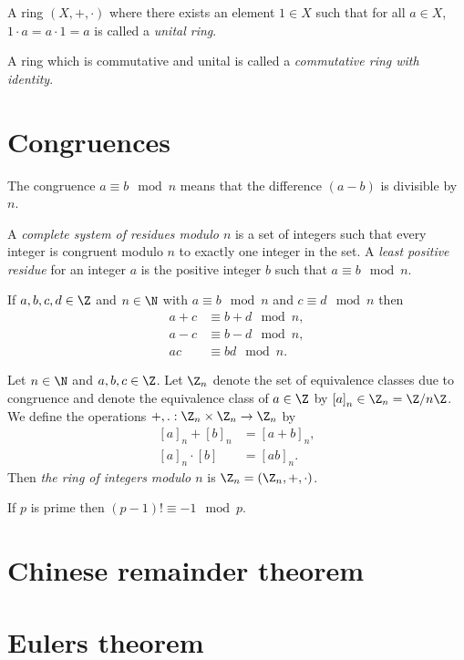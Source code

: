 \documentclass{article}
\begin{document}
\begin{definition}
    A ring $(X,+,\cdot)$ where there exists an element $1\in X$ such that 
    for all $a\in X$, $1\cdot a = a \cdot 1 = a$ is called a \emph{unital ring}.
\end{definition}

\begin{definition}
    A ring which is commutative and unital is called a \emph{commutative ring
    with identity}.
\end{definition}

\section{Congruences}

\begin{definition}[Congruence]
    The congruence $a\equiv b\mod n$ means that the difference $(a-b)$ is 
    divisible by $n$.
\end{definition}

\begin{definition}
    A \emph{complete system of residues modulo $n$} is a set of integers 
    such that every integer is congruent modulo $n$ to exactly one integer 
    in the set. A \emph{least positive residue} for an integer $a$ is the 
    positive integer $b$ such that $a\equiv b \mod n$.
\end{definition}

\begin{theorem}
    If $a,b,c,d\in\Z$ and $n\in\N$ with $a\equiv b\mod n$ and $c\equiv d\mod n$
    then 
    \begin{align*}
        a+c & \equiv b+d \mod n,\\
        a-c & \equiv b-d \mod n,\\
        ac  & \equiv bd  \mod n.
    \end{align*} 
\end{theorem}

\begin{definition}
    Let $n\in\N$ and $a,b,c\in\Z$. Let $\Z_n$ denote the set of equivalence
    classes due to congruence and denote the equivalence class of $a\in\Z$ by 
    $\left[a\right]_n\in\Z_n=\Z/n\Z$. We define the operations $+,.:\Z_n\times\Z_n\to\Z_n$
    by 
    \begin{align*}
        \left[a\right]_n +     \left[b\right]_n   & = \left[a+b\right]_n,\\
        \left[a\right]_n \cdot \left[b\right]     & = \left[ab\right]_n.
    \end{align*}
    Then \emph{the ring of integers modulo $n$} is $\Z_n=(\Z_n,+,\cdot)$.
\end{definition}

\begin{theorem}[Wilson]
    If $p$ is prime then $(p-1)!\equiv -1 \mod p$. 
\end{theorem}

\section{Chinese remainder theorem}

\section{Eulers theorem}
\end{document}
